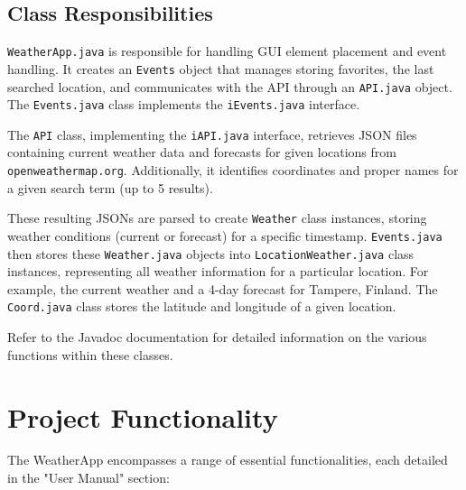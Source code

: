 \documentclass[a4paper,10pt]{article}
\begin{document}
\subsection{Class Responsibilities}


\texttt{WeatherApp.java} is responsible for handling GUI element placement and event handling. It creates an \texttt{Events} object that manages storing favorites, the last searched location, and communicates with the API through an \texttt{API.java} object. The \texttt{Events.java} class implements the \texttt{iEvents.java} interface. 

The \texttt{API} class, implementing the \texttt{iAPI.java} interface, retrieves JSON files containing current weather data and forecasts for given locations from \texttt{openweathermap.org}. Additionally, it identifies coordinates and proper names for a given search term (up to 5 results).

These resulting JSONs are parsed to create \texttt{Weather} class instances, storing weather conditions (current or forecast) for a specific timestamp. \texttt{Events.java} then stores these \texttt{Weather.java} objects into \texttt{LocationWeather.java} class instances, representing all weather information for a particular location. For example, the current weather and a 4-day forecast for Tampere, Finland. The \texttt{Coord.java} class stores the latitude and longitude of a given location.

Refer to the Javadoc documentation for detailed information on the various functions within these classes.


\section{Project Functionality}

The WeatherApp encompasses a range of essential functionalities, each detailed in the "User Manual" section:
\end{document}
